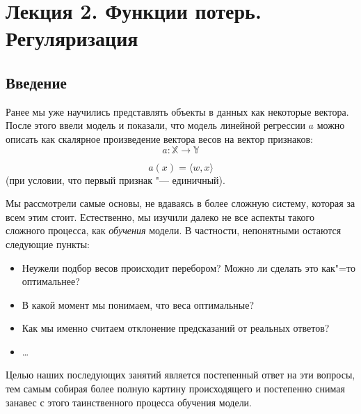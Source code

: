 \section*{Лекция 2. Функции потерь. Регуляризация}
\subsection* {Введение}

Ранее мы уже научились представлять объекты в данных как некоторые
вектора. После этого ввели модель и показали, что модель линейной регрессии $a$ можно описать как скалярное произведение вектора весов на вектор  признаков:
\[
a: \mathbb{X} \rightarrow \mathbb{Y}
\]

\[
a(x) = \langle w,x\rangle
\]
(при условии, что первый признак "--- единичный).

Мы рассмотрели самые основы, не вдаваясь в более сложную систему, которая
за всем этим стоит. Естественно, мы изучили далеко не все аспекты такого сложного процесса, как \textit{обучения} модели. В частности, непонятными остаются следующие пункты:
\begin{itemize}
    \item Неужели подбор весов происходит перебором? Можно ли сделать это
    как"=то оптимальнее?
    \item В какой момент мы понимаем, что веса оптимальные?
    \item Как мы именно считаем отклонение предсказаний от реальных
    ответов?
    \item \dots
\end{itemize}

Целью наших последующих занятий является постепенный ответ на эти вопросы,
тем самым собирая более полную картину происходящего и постепенно снимая занавес с этого таинственного процесса обучения модели.